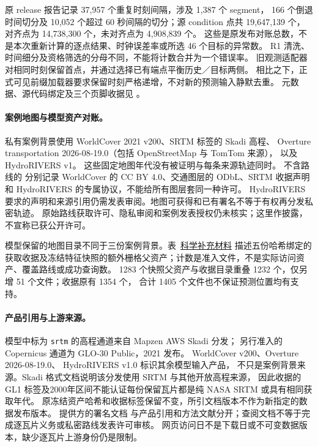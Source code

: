 原 release 报告记录 37,957 个重复时刻间隔，涉及 1,387 个 segment，
166 个倒退时间切分及 10,052 个超过 60 秒间隔的切分；源 condition 点共 19,647,139 个，
对齐点为 14,738,300 个，未对齐点为 4,908,839 个。
这些是原发布对账总数，不是本次重新计算的逐点结果、时钟误差率或所选 46 个目标的异常数。
R1 清洗、时间细分及资格筛选的分母不同，不能将计数合并为一个错误率。
旧观测适配器 对相同时刻保留首点，并通过选择已有端点平衡历史／目标两侧。
相比之下，正式可见前缀加载器要求保留时刻严格递增，不对新的预测输入静默去重。
元数据、源代码绑定及三个页脚收据见 。

\paragraph{案例地图与模型资产对账。}
私有案例背景使用 WorldCover 2021 v200\cite{worldcover2021}、SRTM 标签的 Skadi 高程\cite{mapzenterrain}、
Overture transportation 2026-08-19.0（包括 OpenStreetMap 与 TomTom 来源）\cite{overture202608,overtureattribution}，
以及 HydroRIVERS v1\cite{hydrorivers2013,hydroriverslicense}。
这些固定地图年代没有被证明与每条来源轨迹同时。
不含路线的  分别记录
WorldCover 的 CC BY 4.0、交通图层的 ODbL、SRTM 收据声明和 HydroRIVERS 的专属协议，不能给所有图层套同一种许可。
HydroRIVERS 要求的声明和来源引用仍需发表审阅。地图可获得和已有署名不等于有权再分发私密轨迹。
原始路线获取许可、隐私审阅和案例发表授权仍未核实；这里作披露，不宣称已获公开许可。

模型保留的地图目录不同于三份案例背景。表~\href{supplement.pdf\#tab:model-map-catalog}{科学补充材料} 描述五份哈希绑定的
获取收据及冻结特征快照的额外栅格父资产；计数是准入文件，不是实际访问资产、覆盖路线或成功查询数。
1283 个快照父资产与收据目录重叠 1232 个，仅另增 51 个文件；收据原有 1354 个，
合计 1405 个文件也不保证预测位置均有支持。

\paragraph{产品引用与上游来源。}
模型中标为 \texttt{srtm} 的高程通道来自 Mapzen AWS Skadi 分发\cite{mapzenterrain}；
另行准入的 Copernicus 通道为 GLO-30 Public，2021 发布\cite{copernicusdem2021}。
WorldCover v200\cite{worldcover2021}、Overture 2026-08-19.0\cite{overture202608}、
HydroRIVERS v1.0\cite{hydrorivers2013,hydroriverslicense} 标识其余模型输入产品，
不只是案例背景来源。Skadi 格式文档说明该分发使用 SRTM 与其他开放高程来源，
因此收据的 GL1 标签及2000年区间不能认证每份保留瓦片都是纯 NASA SRTM 或具有相同获取年代。
原冻结资产哈希和收据标签保留不变，所引文档版本不作为新指定的数据发布版本。
提供方的署名文档\cite{mapzenattribution,overtureattribution,hydroriverslicense}
与产品引用和方法文献分开；查阅文档不等于完成逐瓦片义务或私密路线发表许可审核。
网页访问日不是下载日或不可变数据版本，缺少逐瓦片上游身份仍是限制。


